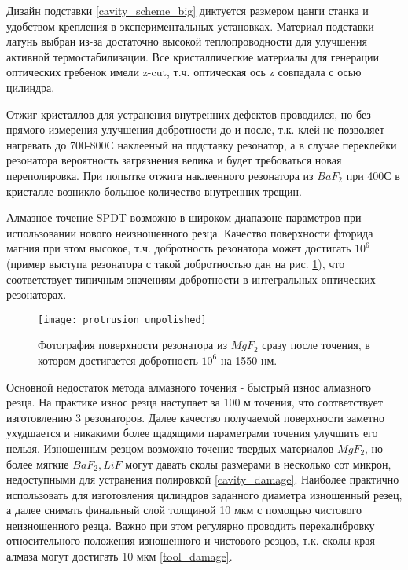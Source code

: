 Дизайн подставки \ref{cavity_scheme_big} диктуется размером цанги станка и удобством крепления в экспериментальных установках. Материал подставки латунь выбран из-за достаточно высокой теплопроводности для улучшения активной термостабилизации. Все кристаллические материалы для генерации оптических гребенок имели z-cut, т.ч. оптическая ось z совпадала с осью цилиндра.

Отжиг кристаллов для устранения внутренних дефектов проводился, но без прямого измерения улучшения добротности до и после, т.к. клей не позволяет нагревать до 700-800С наклееный на подставку резонатор, а в случае переклейки резонатора вероятность загрязнения велика и будет требоваться новая переполировка. При попытке отжига наклеенного резонатора из $BaF_2$ при 400С в кристалле возникло большое количество внутренних трещин.

Алмазное точение SPDT возможно в широком диапазоне параметров при использовании нового неизношенного резца. Качество поверхности фторида магния при этом высокое, т.ч. добротность резонатора может достигать $10^6$ (пример выступа резонатора с такой добротностью дан на рис. \ref{protrusion_unpolished}), что соответствует типичным значениям добротности в интегральных оптических резонаторах.

\begin{figure}[ht]
\centering
  \texttt{[image: protrusion\_unpolished]}
  \caption{Фотография поверхности резонатора из $MgF_2$ сразу после точения, в котором достигается добротность $10^6$ на 1550 нм.}
  \label{protrusion_unpolished}
\end{figure}

Основной недостаток метода алмазного точения - быстрый износ алмазного резца. На практике износ резца наступает за 100 м точения, что соответствует изготовлению 3 резонаторов. Далее качество получаемой поверхности заметно ухудшается и никакими более щадящими параметрами точения улучшить его нельзя. Изношенным резцом возможно точение твердых материалов $MgF_2$, но более мягкие $BaF_2, LiF$ могут давать сколы размерами в несколько сот микрон, недоступными для устранения полировкой \ref{cavity_damage}. Наиболее практично использовать для изготовления цилиндров заданного диаметра изношенный резец, а далее снимать финальный слой толщиной 10 мкм с помощью чистового неизношенного резца. Важно при этом регулярно проводить перекалибровку относительного положения изношенного и чистового резцов, т.к. сколы края алмаза могут достигать 10 мкм \ref{tool_damage}.

